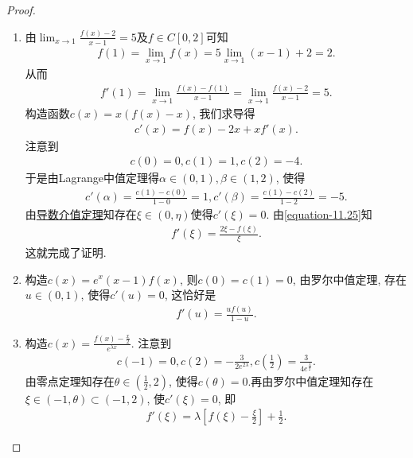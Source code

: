 \documentclass[../../main.tex]{subfiles}%
\begin{document}
\begin{proof}
\begin{enumerate}
\item 由\(\lim_{x\rightarrow 1}\frac{f(x) - 2}{x - 1}=5\)及\(f\in C[0,2]\)可知
\begin{align*}
f(1)=\lim_{x\rightarrow 1}f(x)=5\lim_{x\rightarrow 1}(x - 1)+2=2.
\end{align*}
从而
\begin{align*}
f'(1)=\lim_{x\rightarrow 1}\frac{f(x)-f(1)}{x - 1}=\lim_{x\rightarrow 1}\frac{f(x)-2}{x - 1}=5.
\end{align*}
构造函数\(c(x)=x(f(x)-x)\), 我们求导得
\begin{align}\label{equation-11.25}
c'(x)=f(x)-2x+xf'(x).
\end{align}
注意到
\begin{align*}
c(0)=0,c(1)=1,c(2)=-4.
\end{align*}
于是由Lagrange中值定理得\(\alpha\in(0,1),\beta\in(1,2)\), 使得
\begin{align*}
c'(\alpha)=\frac{c(1)-c(0)}{1 - 0}=1,c'(\beta)=\frac{c(1)-c(2)}{1 - 2}=-5.
\end{align*}
由\hyperref[theorem:导数介值定理]{导数介值定理}知存在\(\xi\in(0,\eta)\)使得\(c'(\xi)=0\). 由\eqref{equation-11.25}知
\begin{align*}
f'(\xi)=\frac{2\xi - f(\xi)}{\xi}.
\end{align*}
这就完成了证明.

\item 构造\(c(x)=e^{x}(x - 1)f(x)\), 则\(c(0)=c(1)=0\), 由罗尔中值定理, 存在\(u\in(0,1)\), 使得\(c'(u)=0\), 这恰好是
\begin{align*}
f'(u)=\frac{uf(u)}{1 - u}.
\end{align*}

\item 构造\(c(x)=\frac{f(x)-\frac{x}{2}}{e^{\lambda x}}\). 注意到
\begin{align*}
c(-1)=0,c(2)=-\frac{3}{2e^{2\lambda}},c\left(\frac{1}{2}\right)=\frac{3}{4e^{\frac{\lambda}{2}}}.
\end{align*}
由零点定理知存在\(\theta\in(\frac{1}{2},2)\), 使得\(c(\theta)=0\).再由罗尔中值定理知存在\(\xi\in(-1,\theta)\subset(-1,2)\), 使\(c'(\xi)=0\), 即
\begin{align*}
f'(\xi)=\lambda\left[f(\xi)-\frac{\xi}{2}\right]+\frac{1}{2}.
\end{align*}
\end{enumerate}
\end{proof}
\end{document}
